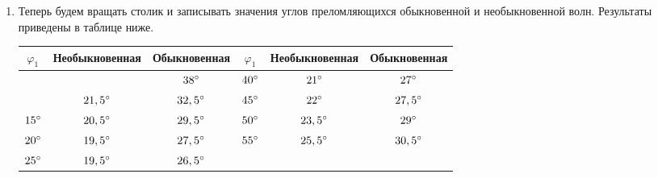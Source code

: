 \documentclass[a4paper,12pt]{article}
\begin{document}
\begin{enumerate}
    \item
    Теперь будем вращать столик и записывать значения углов преломляющихся обыкновенной и необыкновенной волн. Результаты приведены в таблице ниже. 
    \begin{table}[H]\label{tab: data}
        \centering
        \begin{tabular}{|c|c|c|c|c|c|}
            \hline
            \rowcolor[HTML]{FFFFFF} 
            {\color[HTML]{000000} $\varphi_1$} &
              {\color[HTML]{000000} Необыкновенная} &
              {\color[HTML]{000000} Обыкновенная} &
              {\color[HTML]{000000} $\varphi_1$} &
              {\color[HTML]{000000} Необыкновенная} &
              {\color[HTML]{000000} Обыкновенная} \\ \hline
            \rowcolor[HTML]{FFFFFF} 
            \cellcolor[HTML]{FFFFFF}{\color[HTML]{000000} $5\degree$} &
              \cellcolor[HTML]{FFFFFF}{\color[HTML]{000000} $23,5\degree$} &
              {\color[HTML]{000000} $38\degree$} &
              {\color[HTML]{000000} $40\degree$} &
              {\color[HTML]{000000} $21\degree$} &
              {\color[HTML]{000000} $27\degree$} \\ \hline
            \rowcolor[HTML]{FFFFFF} 
            \cellcolor[HTML]{FFFFFF}{\color[HTML]{000000} $10\degree$} &
              {\color[HTML]{000000} $21,5\degree$} &
              {\color[HTML]{000000} $32,5\degree$} &
              {\color[HTML]{000000} $45\degree$} &
              {\color[HTML]{000000} $22\degree$} &
              {\color[HTML]{000000} $27,5\degree$} \\ \hline
            \rowcolor[HTML]{FFFFFF} 
            {\color[HTML]{000000} $15\degree$} &
              {\color[HTML]{000000} $20,5\degree$} &
              {\color[HTML]{000000} $29,5\degree$} &
              {\color[HTML]{000000} $50\degree$} &
              {\color[HTML]{000000} $23,5\degree$} &
              {\color[HTML]{000000} $29\degree$} \\ \hline
            \rowcolor[HTML]{FFFFFF} 
            {\color[HTML]{000000} $20\degree$} &
              {\color[HTML]{000000} $19,5\degree$} &
              {\color[HTML]{000000} $27,5\degree$} &
              {\color[HTML]{000000} $55\degree$} &
              {\color[HTML]{000000} $25,5\degree$} &
              {\color[HTML]{000000} $30,5\degree$} \\ \hline
            \rowcolor[HTML]{FFFFFF} 
            {\color[HTML]{000000} $25\degree$} &
              {\color[HTML]{000000} $19,5\degree$} &
              {\color[HTML]{000000} $26,5\degree$} &

\end{tabular}
\end{table}
\end{enumerate}
\end{document}
